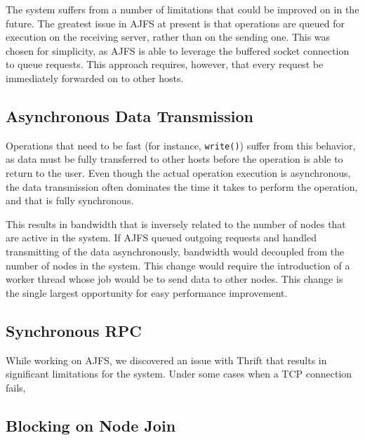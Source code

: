 
The system suffers from a number of limitations that could be improved on in the
future. The greatest issue in AJFS at present is that operations are queued for
execution on the receiving server, rather than on the sending one. This was
chosen for simplicity, as AJFS is able to leverage the buffered socket
connection to queue requests. This approach requires, however, that every
request be immediately forwarded on to other hosts.

\subsection{Asynchronous Data Transmission}

Operations that need to be fast (for instance, \texttt{write()}) suffer from
this behavior, as data must  be fully transferred to other hosts before the
operation is able to return to the user. Even though the actual operation
execution is asynchronous, the data transmission often dominates the time it
takes to perform the operation, and that is fully synchronous.

This results in bandwidth that is inversely related to the number of nodes
that are active in the system. If AJFS queued outgoing requests and handled
transmitting of the data asynchronously, bandwidth would decoupled from the 
number of nodes in the system. This change would require the introduction of a
worker thread whose job would be to send data to other nodes. This change is the
single largest opportunity for easy performance improvement.

\subsection{Synchronous RPC}

While working on AJFS, we discovered an issue with Thrift that results in
significant limitations for the system. Under some cases when a TCP connection
fails,  



\subsection{Blocking on Node Join}

